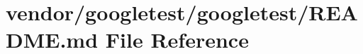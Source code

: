 \hypertarget{vendor_2googletest_2googletest_2readme_8md}{}\section{vendor/googletest/googletest/\+R\+E\+A\+D\+ME.md File Reference}
\label{vendor_2googletest_2googletest_2readme_8md}
